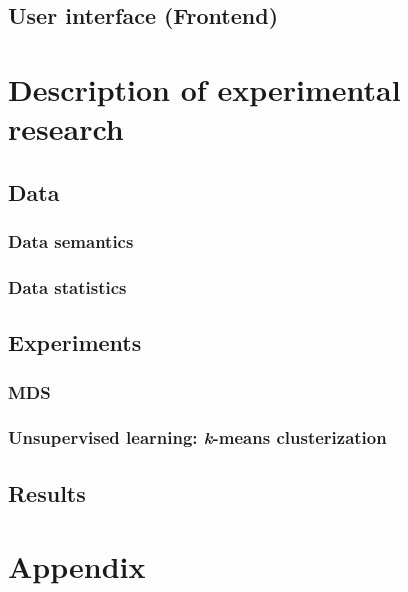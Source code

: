 \documentclass[a4paper,12pt]{article}
\begin{document}
    \subsection{User interface (Frontend)}
    
    \section{Description of experimental research}
    
    \subsection{Data}
    \subsubsection{Data semantics}
    \subsubsection{Data statistics}
   	\subsection{Experiments}
   	\subsubsection{MDS}
   	\subsubsection{Unsupervised learning: {\textit k-means} clusterization }
   	
   	\subsection{Results}
    
   
    \clearpage
    
    {}
    
    
%    	
%          
%        
%        
%        
%    
        
    \clearpage
    
      
	\appendix
	\section{Appendix}
    
    
\end{document}
